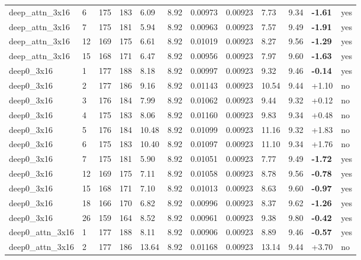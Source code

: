 \documentclass[10pt,a4paper]{article}
\begin{document}
\begin{landscape}
\begin{footnotesize}
\begin{longtable}{llllllllllll}
deep\_attn\_3x16 & 6 & 175 & 183 & 6.09 & 8.92 & 0.00973 & 0.00923 & 7.73 & 9.34 & \textbf{-1.61} & yes \\
deep\_attn\_3x16 & 7 & 175 & 181 & 5.94 & 8.92 & 0.00963 & 0.00923 & 7.57 & 9.49 & \textbf{-1.91} & yes \\
deep\_attn\_3x16 & 12 & 169 & 175 & 6.61 & 8.92 & 0.01019 & 0.00923 & 8.27 & 9.56 & \textbf{-1.29} & yes \\
deep\_attn\_3x16 & 15 & 168 & 171 & 6.47 & 8.92 & 0.00956 & 0.00923 & 7.97 & 9.60 & \textbf{-1.63} & yes \\
deep0\_3x16 & 1 & 177 & 188 & 8.18 & 8.92 & 0.00997 & 0.00923 & 9.32 & 9.46 & \textbf{-0.14} & yes \\
deep0\_3x16 & 2 & 177 & 186 & 9.16 & 8.92 & 0.01143 & 0.00923 & 10.54 & 9.44 & +1.10 & no \\
deep0\_3x16 & 3 & 176 & 184 & 7.99 & 8.92 & 0.01062 & 0.00923 & 9.44 & 9.32 & +0.12 & no \\
deep0\_3x16 & 4 & 175 & 183 & 8.06 & 8.92 & 0.01160 & 0.00923 & 9.83 & 9.34 & +0.48 & no \\
deep0\_3x16 & 5 & 176 & 184 & 10.48 & 8.92 & 0.01099 & 0.00923 & 11.16 & 9.32 & +1.83 & no \\
deep0\_3x16 & 6 & 175 & 183 & 10.40 & 8.92 & 0.01097 & 0.00923 & 11.10 & 9.34 & +1.76 & no \\
deep0\_3x16 & 7 & 175 & 181 & 5.90 & 8.92 & 0.01051 & 0.00923 & 7.77 & 9.49 & \textbf{-1.72} & yes \\
deep0\_3x16 & 12 & 169 & 175 & 7.11 & 8.92 & 0.01058 & 0.00923 & 8.78 & 9.56 & \textbf{-0.78} & yes \\
deep0\_3x16 & 15 & 168 & 171 & 7.10 & 8.92 & 0.01013 & 0.00923 & 8.63 & 9.60 & \textbf{-0.97} & yes \\
deep0\_3x16 & 18 & 166 & 170 & 6.82 & 8.92 & 0.00996 & 0.00923 & 8.37 & 9.62 & \textbf{-1.26} & yes \\
deep0\_3x16 & 26 & 159 & 164 & 8.52 & 8.92 & 0.00961 & 0.00923 & 9.38 & 9.80 & \textbf{-0.42} & yes \\
deep0\_attn\_3x16 & 1 & 177 & 188 & 8.11 & 8.92 & 0.00906 & 0.00923 & 8.89 & 9.46 & \textbf{-0.57} & yes \\
deep0\_attn\_3x16 & 2 & 177 & 186 & 13.64 & 8.92 & 0.01168 & 0.00923 & 13.14 & 9.44 & +3.70 & no \\
\bottomrule \end{longtable}
\end{footnotesize}
\end{landscape}
\end{document}
